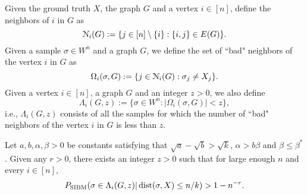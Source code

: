 \documentclass{article}
\begin{document}
Given the ground truth $X$, the graph $G$ and a vertex $i\in[n]$, define the neighbors of $i$ in $G$ as 
\begin{equation} \label{eq:ngbi}
\mathcal{N}_i(G) := \{j\in[n]\setminus\{i\}:
\{i,j\}\in E(G) \} .
\end{equation}
Given a sample $\sigma\in W^n$ and a graph $G$,  we define the set of ``bad" neighbors of the vertex $i$ in $G$ as
$$
\Omega_i(\sigma,G):=\{j\in \mathcal{N}_i(G): 
\sigma_j \neq X_j \} .
$$
Given a vertex $i\in[n]$, a graph $G$ and an integer $z>0$, we also define
$$
\Lambda_i(G, z):=\{ \sigma\in W^n: |\Omega_i(\sigma,G)| < z \} ,
$$
i.e., $\Lambda_i(G, z)$ consists of all the samples for which the number of ``bad" neighbors of the vertex $i$ in $G$ is less than $z$.

\begin{lemma} \label{lm:us}
Let $a,b,\alpha,\beta> 0$ be constants satisfying that $\sqrt{a}-\sqrt{b} > \sqrt{k}$, $\alpha>b\beta$ and $\beta\le \beta^\ast$.
Given any $r>0$, there exists an integer $z>0$ such that for large enough $n$ and every $i\in[n]$, 
\begin{equation} \label{eq:zr}
P_{\operatorname{SIBM}} (\sigma\in \Lambda_i(G, z)
| \operatorname{dist}(\sigma, X) \le n/k)
> 1 - n^{-r} .
\end{equation}
\end{lemma}
\end{document}
